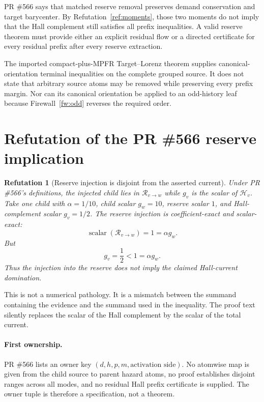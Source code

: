 \documentclass[11pt]{article}
\newtheorem{refutation}[theorem]{Refutation}
\newcommand{\1}{\mathbf 1}
\begin{document}
PR \#566 says that matched reserve removal preserves demand conservation and target barycenter.  By Refutation~\ref{ref:moments}, those two moments do not imply that the Hall complement still satisfies all prefix inequalities.  A valid reserve theorem must provide either an explicit residual flow or a directed certificate for every residual prefix after every reserve extraction.

The imported compact-plus-MPFR Target--Lorenz theorem supplies canonical-orientation terminal inequalities on the complete grouped source.  It does not state that arbitrary source atoms may be removed while preserving every prefix margin.  Nor can its canonical orientation be applied to an odd-history leaf because Firewall~\ref{fw:odd} reverses the required order.

\section{Refutation of the PR \#566 reserve implication}

\begin{refutation}[Reserve injection is disjoint from the asserted current]\label{ref:reserve}
Under PR \#566's definitions, the injected child lies in $\mathcal R_{v\to w}$ while $g_v$ is the scalar of $\mathcal H_v$.  Take one child with $\alpha=1/10$, child scalar $g_w=10$, reserve scalar $1$, and Hall-complement scalar $g_v=1/2$.  The reserve injection is coefficient-exact and scalar-exact:
\[
\operatorname{scalar}(\mathcal R_{v\to w})=1=\alpha g_w.
\]
But
\[
g_v=\frac12<1=\alpha g_w.
\]
Thus the injection into the reserve does not imply the claimed Hall-current domination.
\end{refutation}

This is not a numerical pathology.  It is a mismatch between the summand containing the evidence and the summand used in the inequality.  The proof text silently replaces the scalar of the Hall complement by the scalar of the total current.

\paragraph{First ownership.}
PR \#566 lists an owner key $(d,h,p,m,\text{activation side})$.  No atomwise map is given from the child source to parent hazard atoms, no proof establishes disjoint ranges across all modes, and no residual Hall prefix certificate is supplied.  The owner tuple is therefore a specification, not a theorem.
\end{document}
